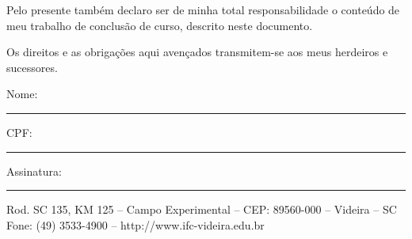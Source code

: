 \begin{folhadeautorizacao}
  Pelo presente também declaro ser de minha total responsabilidade o conteúdo de meu trabalho de conclusão de curso, descrito neste documento.

  Os direitos e as obrigações aqui avençados transmitem-se aos meus herdeiros e sucessores.

  \vspace*{\fill}
  \noindent Nome: \rule{10cm}{0.4pt}
  \par\vspace{0.25cm}
  \noindent CPF: \rule{5cm}{0.4pt}
  \par\vspace{0.25cm}
  \noindent Assinatura: \rule{9cm}{0.4pt}
  \par\vspace{0.5cm}
  \begin{center}
    \SingleSpacing\small
    Rod. SC 135, KM 125 -- Campo Experimental -- CEP: 89560-000 -- Videira -- SC \\
    Fone: (49) 3533-4900 -- http://www.ifc-videira.edu.br
  \end{center}
\end{folhadeautorizacao}
